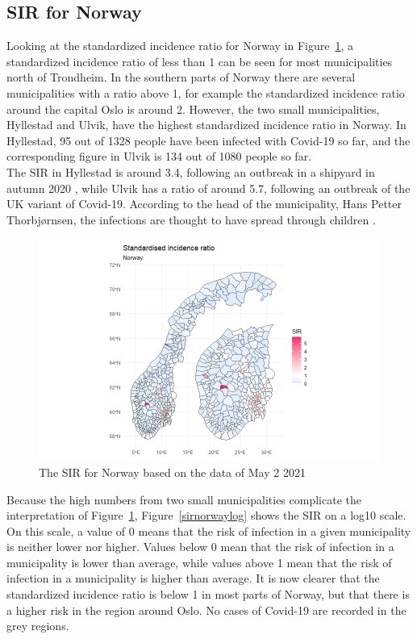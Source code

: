 \subsection{SIR for Norway}
Looking at the standardized incidence ratio for Norway in Figure~\ref{sirnorway}, a standardized incidence ratio of less than 1 can be seen for most municipalities north of Trondheim. In the southern parts of Norway there are several municipalities with a ratio above 1, for example the standardized incidence ratio around the capital Oslo is around 2. However, the two small municipalities, Hyllestad and Ulvik, have the highest standardized incidence ratio in Norway. In Hyllestad, 95 out of 1328 people have been infected with Covid-19 so far, and the corresponding figure in Ulvik is 134 out of 1080 people so far. \\
The SIR in Hyllestad is around 3.4, following an outbreak in a shipyard in autumn 2020 \autocite[][]{newspaper1}, while Ulvik has a ratio of around 5.7, following an outbreak of the UK variant of Covid-19. According to the head of the municipality, Hans Petter Thorbjørnsen, the infections are thought to have spread through children \autocite[][]{newspaper2}.
\begin{figure}[H]
 \centering
 \includegraphics[width = 1.2\textwidth]{sir_norway.png}
 \caption{The SIR for Norway based on the data of May 2 2021}
 \label{sirnorway}
\end{figure}
Because the high numbers from two small municipalities complicate the interpretation of Figure~\ref{sirnorway}, Figure~\ref{sirnorwaylog} shows the SIR on a log10 scale. On this scale, a value of 0 means that the risk of infection in a given municipality is neither lower nor higher. Values below 0 mean that the risk of infection in a municipality is lower than average, while values above 1 mean that the risk of infection in a municipality is higher than average. It is now clearer that the standardized incidence ratio is below 1 in most parts of Norway, but that there is a higher risk in the region around Oslo. No cases of Covid-19 are recorded in the grey regions.
